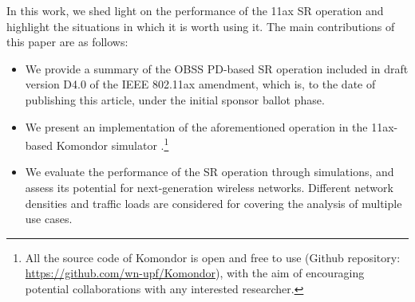 \documentclass[conference]{IEEEtran}
\begin{document}
    \begin{table}[]
    	\caption{Effect of increasing the OBSS/PD threshold and the transmission power.}
    	\label{tbl:effects_sr}
    \end{table}
	
    In this work, we shed light on the performance of the 11ax SR operation and highlight the situations in which it is worth using it. The main contributions of this paper are as follows:
	\begin{itemize}
		\item We provide a summary of the OBSS PD-based SR operation included in draft version D4.0 of the IEEE 802.11ax amendment, which is, to the date of publishing this article, under the initial sponsor ballot phase.
		\item We present an implementation of the aforementioned operation in the 11ax-based Komondor simulator \cite{komondor}.\footnote{All the source code of Komondor is open and free to use (Github repository: \url{https://github.com/wn-upf/Komondor}), with the aim of encouraging potential collaborations with any interested researcher.}
		\item We evaluate the performance of the SR operation through simulations, and assess its potential for next-generation wireless networks. Different network densities and traffic loads are considered for covering the analysis of multiple use cases.
	\end{itemize}
	
\end{document}
